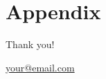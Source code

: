 \documentclass[10pt]{beamer}
\newcommand*{\RefsPath}{./references}
\newcommand*{\RefsPath}{./references}
\begin{document}

\newsavebox\mytempbib

\savebox\mytempbib{\parbox{\textwidth}{}}



\section*{Appendix}

\appendix
\backupbegin

\begin{frame}
    \centering
    \begin{LARGE}Thank you!\end{LARGE}

    \vspace{1em}

    \begin{Large}\href{mailto:your@email.com}{your@email.com}\end{Large}

\end{frame}

\end{document}
